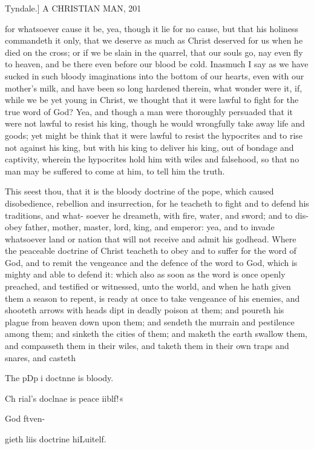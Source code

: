 \documentclass{custom}
\begin{document}
Tyndale.]
A CHRISTIAN MAN, 
201

for whatsoever cause it be, yea, though it lie for no cause, 
but that his holiness commandeth it only, that we deserve 
as much as Christ deserved for us when he died on the 
cross; or if we be slain in the quarrel, that our souls go, 
nay even fly to heaven, and be there even before our blood 
be cold. Inasmuch I say as we have sucked in such bloody 
imaginations into the bottom of our hearts, even with our 
mother's milk, and have been so long hardened therein, 
what wonder were it, if, while we be yet young in Christ, 
we thought that it were lawful to fight for the true word of 
God? Yea, and though a man were thoroughly persuaded 
that it were not lawful to resist his king, though he would 
wrongfully take away life and goods; yet might be think 
that it were lawful to resist the hypocrites and to rise not 
against his king, but with his king to deliver his king, out 
of bondage and captivity, wherein the hypocrites hold him 
with wiles and falsehood, so that no man may be suffered 
to come at him, to tell him the truth. 

This seest thou, that it is the bloody doctrine of the pope, 
which caused disobedience, rebellion and insurrection, for 
he teacheth to fight and to defend his traditions, and what- 
soever he dreameth, with fire, water, and sword; and to dis- 
obey father, mother, master, lord, king, and emperor: yea, 
and to invade whatsoever land or nation that will not receive 
and admit his godhead. Where the peaceable doctrine of 
Christ teacheth to obey and to suffer for the word of God, 
and to remit the vengeance and the defence of the word to 
God, which is mighty and able to defend it: which also as 
soon as the word is once openly preached, and testified or 
witnessed, unto the world, and when he hath given them a 
season to repent, is ready at once to take vengeance of his 
enemies, and shooteth arrows with heads dipt in deadly 
poison at them; and poureth his plague from heaven down 
upon them; and sendeth the murrain and pestilence among 
them; and sinketh the cities of them; and maketh the earth 
swallow them, and compasseth them in their wiles, and 
taketh them in their own traps and snares, and casteth 

The pDp^^^i 
doctnne is 
bloody. 

Ch rial's 
doclnae is 
peace iiblf!« 

God ftven- 

gieth liis 
doctrine 
hiLuitelf. 
\end{document}
